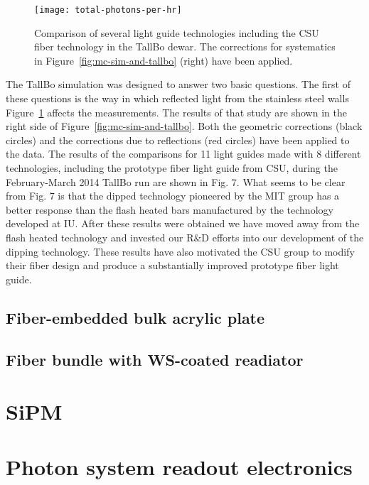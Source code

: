 \begin{figure}[htbp]
\centering
\texttt{[image: total-photons-per-hr]}
\caption{Comparison of several light guide technologies including the CSU fiber technology in the TallBo dewar.  The corrections for systematics in Figure~\ref{fig:mc-sim-and-tallbo} (right) have been applied. }
\label{fig:total-photons-per-hr}
\end{figure}

The TallBo simulation was designed to answer two basic questions.  The
first of these questions is the way in which reflected light from the
stainless steel walls Figure~\ref{fig:total-photons-per-hr} affects
the measurements.  The results of that study are shown in the right
side of Figure~\ref{fig:mc-sim-and-tallbo}.  Both the geometric
corrections (black circles) and the corrections due to reflections
(red circles) have been applied to the data.  The results of the
comparisons for 11 light guides made with 8 different technologies,
including the prototype fiber light guide from CSU, during the
February-March 2014 TallBo run are shown in Fig. 7.  What seems to be
clear from Fig. 7 is that the dipped technology pioneered by the MIT
group has a better response than the flash heated bars manufactured by
the technology developed at IU.  After these results were obtained we
have moved away from the flash heated technology and invested our R\&D
efforts into our development of the dipping technology.  These results
have also motivated the CSU group to modify their fiber design and
produce a substantially improved prototype fiber light guide.

\subsection{Fiber-embedded bulk acrylic plate}

\subsection{Fiber bundle with WS-coated readiator}

\section{SiPM}

\section{Photon system readout electronics}
\label{sec_elec}

